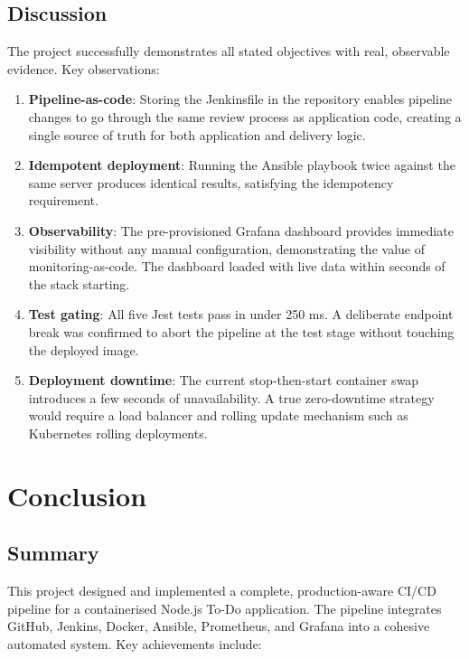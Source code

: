 \documentclass[12pt,a4paper]{report}
\begin{document}
\section{Discussion}
The project successfully demonstrates all stated objectives with real, observable evidence. Key observations:
\begin{enumerate}
    \item \textbf{Pipeline-as-code}: Storing the Jenkinsfile in the repository enables pipeline changes to go through the same review process as application code, creating a single source of truth for both application and delivery logic.
    \item \textbf{Idempotent deployment}: Running the Ansible playbook twice against the same server produces identical results, satisfying the idempotency requirement.
    \item \textbf{Observability}: The pre-provisioned Grafana dashboard provides immediate visibility without any manual configuration, demonstrating the value of monitoring-as-code. The dashboard loaded with live data within seconds of the stack starting.
    \item \textbf{Test gating}: All five Jest tests pass in under 250 ms. A deliberate endpoint break was confirmed to abort the pipeline at the test stage without touching the deployed image.
    \item \textbf{Deployment downtime}: The current stop-then-start container swap introduces a few seconds of unavailability. A true zero-downtime strategy would require a load balancer and rolling update mechanism such as Kubernetes rolling deployments.
\end{enumerate}

\chapter{Conclusion}

\section{Summary}
This project designed and implemented a complete, production-aware CI/CD pipeline for a containerised Node.js To-Do application. The pipeline integrates GitHub, Jenkins, Docker, Ansible, Prometheus, and Grafana into a cohesive automated system. Key achievements include:
\end{document}
